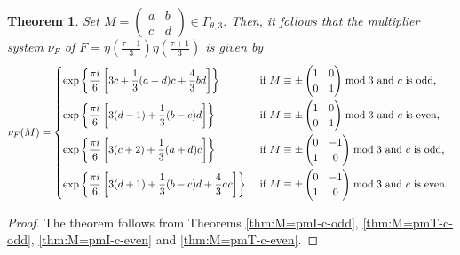 \documentclass[12pt]{article}
\theoremstyle{definition}
\newtheorem{theorem}{Theorem}
\numberwithin{equation}{section}
\numberwithin{theorem}{section}
\begin{document}
\begin{theorem}
\label{summary-level3}
{\it
Set
$
M=
\begin{pmatrix}
a & b \\
c & d
\end{pmatrix}
\in 
\Gamma_{\theta,3}. 
$ 
Then, it follows that 
the multiplier system 
$\nu_{F}$ of 
 $
\displaystyle 
F=
\eta \left(\frac{\tau-1}{3} \right) \eta\left(\frac{\tau+1}{3} \right) 
$ 
is given by 
\begin{equation*}
\nu_{F}(M)=
\begin{cases}
\exp
\left\{
\displaystyle
\frac{\pi i}{6}
\left[
3c+\frac13(a+d)c+\frac43bd
\right]
\right\}   
&
\text
{ 
if
$
M
\equiv 
\pm
\begin{pmatrix}
1 & 0 \\
0 & 1
\end{pmatrix} 
\bmod{3}
$ 
and 
$c$ is odd,
} \vspace{1mm} \\
\exp
\left\{
\displaystyle
\frac{\pi i}{6}
\left[
3(d-1)+\frac13(b-c)d
\right]
\right\}   
&
\text
{ 
if
$
M
\equiv 
\pm
\begin{pmatrix}
1 & 0 \\
0 & 1
\end{pmatrix} 
\bmod{3}
$ 
and 
$c$ is even,
}  \vspace{1mm} \\
\exp
\left\{
\displaystyle
\frac{\pi i}{6}
\left[
3(c+2)+\frac13(a+d)c
\right]
\right\}   
&
\text
{ 
if
$
M
\equiv 
\pm
\begin{pmatrix}
0 & -1 \\
1 & 0
\end{pmatrix} 
\bmod{3}
$ 
and 
$c$ is odd,
}  \vspace{1mm} \\
\exp
\left\{
\displaystyle
\frac{\pi i}{6}
\left[
3(d+1)+\frac13(b-c)d+\frac43ac
\right]
\right\}   
&
\text
{ 
if
$
M
\equiv 
\pm
\begin{pmatrix}
0 & -1 \\
1 & 0
\end{pmatrix} 
\bmod{3}
$ 
and 
$c$ is even.
} 
\end{cases}
\end{equation*}
}
\end{theorem}


\begin{proof}
The theorem follows from 
Theorems 
\ref{thm:M=pmI-c-odd}, 
\ref{thm:M=pmT-c-odd}, 
\ref{thm:M=pmI-c-even} 
and 
\ref{thm:M=pmT-c-even}. 
\end{proof}
\end{document}
